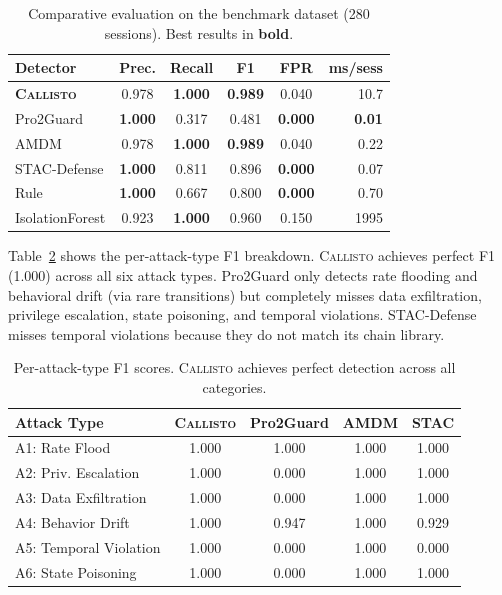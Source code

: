 \documentclass[conference,compsoc]{IEEEtran}
\newcommand{\system}{\textsc{Callisto}}
\begin{document}
\begin{table}[t]
\centering
\caption{Comparative evaluation on the benchmark dataset (280 sessions). Best results in \textbf{bold}.}
\label{tab:comparative}
\small
\begin{tabular}{@{}lccccr@{}}
\toprule
Detector & Prec. & Recall & F1 & FPR & ms/sess \\
\midrule
\textbf{\system{}} & 0.978 & \textbf{1.000} & \textbf{0.989} & 0.040 & 10.7 \\
Pro2Guard & \textbf{1.000} & 0.317 & 0.481 & \textbf{0.000} & \textbf{0.01} \\
AMDM & 0.978 & \textbf{1.000} & \textbf{0.989} & 0.040 & 0.22 \\
STAC-Defense & \textbf{1.000} & 0.811 & 0.896 & \textbf{0.000} & 0.07 \\
Rule & \textbf{1.000} & 0.667 & 0.800 & \textbf{0.000} & 0.70 \\
IsolationForest & 0.923 & \textbf{1.000} & 0.960 & 0.150 & 1995 \\
\bottomrule
\end{tabular}
\end{table}

Table~\ref{tab:perattack} shows the per-attack-type F1 breakdown. \system{} achieves perfect F1 (1.000) across all six attack types. Pro2Guard only detects rate flooding and behavioral drift (via rare transitions) but completely misses data exfiltration, privilege escalation, state poisoning, and temporal violations. STAC-Defense misses temporal violations because they do not match its chain library.

\begin{table}[t]
\centering
\caption{Per-attack-type F1 scores. \system{} achieves perfect detection across all categories.}
\label{tab:perattack}
\small
\begin{tabular}{@{}lcccc@{}}
\toprule
Attack Type & \system{} & Pro2Guard & AMDM & STAC \\
\midrule
A1: Rate Flood & 1.000 & 1.000 & 1.000 & 1.000 \\
A2: Priv. Escalation & 1.000 & 0.000 & 1.000 & 1.000 \\
A3: Data Exfiltration & 1.000 & 0.000 & 1.000 & 1.000 \\
A4: Behavior Drift & 1.000 & 0.947 & 1.000 & 0.929 \\
A5: Temporal Violation & 1.000 & 0.000 & 1.000 & 0.000 \\
A6: State Poisoning & 1.000 & 0.000 & 1.000 & 1.000 \\
\bottomrule
\end{tabular}
\end{table}
\end{document}
